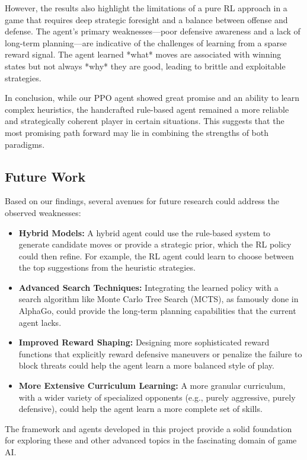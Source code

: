 \documentclass[conference]{IEEEtran}
\begin{document}
However, the results also highlight the limitations of a pure RL approach in a game that requires deep strategic foresight and a balance between offense and defense. The agent's primary weaknesses—poor defensive awareness and a lack of long-term planning—are indicative of the challenges of learning from a sparse reward signal. The agent learned *what* moves are associated with winning states but not always *why* they are good, leading to brittle and exploitable strategies.

In conclusion, while our PPO agent showed great promise and an ability to learn complex heuristics, the handcrafted rule-based agent remained a more reliable and strategically coherent player in certain situations. This suggests that the most promising path forward may lie in combining the strengths of both paradigms.

\subsection{Future Work}
Based on our findings, several avenues for future research could address the observed weaknesses:
\begin{itemize}
    \item \textbf{Hybrid Models:} A hybrid agent could use the rule-based system to generate candidate moves or provide a strategic prior, which the RL policy could then refine. For example, the RL agent could learn to choose between the top suggestions from the heuristic strategies.
    \item \textbf{Advanced Search Techniques:} Integrating the learned policy with a search algorithm like Monte Carlo Tree Search (MCTS), as famously done in AlphaGo, could provide the long-term planning capabilities that the current agent lacks.
    \item \textbf{Improved Reward Shaping:} Designing more sophisticated reward functions that explicitly reward defensive maneuvers or penalize the failure to block threats could help the agent learn a more balanced style of play.
    \item \textbf{More Extensive Curriculum Learning:} A more granular curriculum, with a wider variety of specialized opponents (e.g., purely aggressive, purely defensive), could help the agent learn a more complete set of skills.
\end{itemize}
The framework and agents developed in this project \cite{b4} provide a solid foundation for exploring these and other advanced topics in the fascinating domain of game AI.
\end{document}
